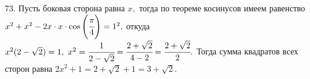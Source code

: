 73. Пусть боковая сторона равна $x,$ тогда по теореме косинусов имеем равенство $x^2+x^2-2x\cdot x\cdot \cos\left(\cfrac{\pi}{4}\right)=1^2,$ откуда $x^2(2-\sqrt{2})=1,\ x^2=\cfrac{1}{2-\sqrt{2}}=\cfrac{2+\sqrt{2}}{4-2}=\cfrac{2+\sqrt{2}}{2}.$ Тогда сумма квадратов всех сторон равна $2x^2+1=2+\sqrt{2}+1=3+\sqrt{2}.$\\
